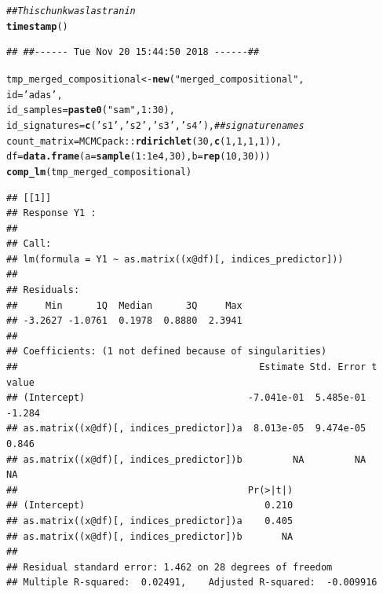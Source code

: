 \documentclass{article}\usepackage[]{graphicx}\usepackage[]{color}
\makeatletter
\newcommand{\hlnum}[1]{\textcolor[rgb]{0.686,0.059,0.569}{#1}}%
\newcommand{\hlstr}[1]{\textcolor[rgb]{0.192,0.494,0.8}{#1}}%
\newcommand{\hlcom}[1]{\textcolor[rgb]{0.678,0.584,0.686}{\textit{#1}}}%
\newcommand{\hlopt}[1]{\textcolor[rgb]{0,0,0}{#1}}%
\newcommand{\hlstd}[1]{\textcolor[rgb]{0.345,0.345,0.345}{#1}}%
\newcommand{\hlkwb}[1]{\textcolor[rgb]{0.69,0.353,0.396}{#1}}%
\newcommand{\hlkwc}[1]{\textcolor[rgb]{0.333,0.667,0.333}{#1}}%
\newcommand{\hlkwd}[1]{\textcolor[rgb]{0.737,0.353,0.396}{\textbf{#1}}}%
\newenvironment{kframe}{%
 \def\at@end@of@kframe{}%
 \ifinner\ifhmode%
  \def\at@end@of@kframe{\end{minipage}}%
  \begin{minipage}{\columnwidth}%
 \fi\fi%
 \def\FrameCommand##1{\hskip\@totalleftmargin \hskip-\fboxsep
 \colorbox{shadecolor}{##1}\hskip-\fboxsep
     \hskip-\linewidth \hskip-\@totalleftmargin \hskip\columnwidth}%
 \MakeFramed {\advance\hsize-\width
   \@totalleftmargin\z@ \linewidth\hsize
   \@setminipage}}%
 {\par\unskip\endMakeFramed%
 \at@end@of@kframe}
\newenvironment{knitrout}{}{} %
\makeatother
\begin{document}
\begin{knitrout}
\color{fgcolor}\begin{kframe}
\begin{alltt}
\hlcom{## This chunk was last ran in}
\hlkwd{timestamp}\hlstd{()}
\end{alltt}
\begin{verbatim}
## ##------ Tue Nov 20 15:44:50 2018 ------##
\end{verbatim}
\begin{alltt}
\hlstd{tmp_merged_compositional} \hlkwb{<-} \hlkwd{new}\hlstd{(}\hlstr{"merged_compositional"}\hlstd{,}
                                \hlkwc{id}\hlstd{=}\hlstr{'adas'}\hlstd{,}
                                \hlkwc{id_samples}\hlstd{=}\hlkwd{paste0}\hlstd{(}\hlstr{"sam"}\hlstd{,} \hlnum{1}\hlopt{:}\hlnum{30}\hlstd{),}
                                \hlkwc{id_signatures}\hlstd{=} \hlkwd{c}\hlstd{(}\hlstr{'s1'}\hlstd{,} \hlstr{'s2'}\hlstd{,} \hlstr{'s3'}\hlstd{,} \hlstr{'s4'}\hlstd{),} \hlcom{## signature names}
                                \hlkwc{count_matrix}\hlstd{=MCMCpack}\hlopt{::}\hlkwd{rdirichlet}\hlstd{(}\hlnum{30}\hlstd{,} \hlkwd{c}\hlstd{(}\hlnum{1}\hlstd{,}\hlnum{1}\hlstd{,}\hlnum{1}\hlstd{,}\hlnum{1}\hlstd{)),}
                                \hlkwc{df}\hlstd{=}\hlkwd{data.frame}\hlstd{(}\hlkwc{a}\hlstd{=}\hlkwd{sample}\hlstd{(}\hlnum{1}\hlopt{:}\hlnum{1e4}\hlstd{,} \hlnum{30}\hlstd{),} \hlkwc{b}\hlstd{=}\hlkwd{rep}\hlstd{(}\hlnum{10}\hlstd{,} \hlnum{30}\hlstd{)))}
\hlkwd{comp_lm}\hlstd{(tmp_merged_compositional)}
\end{alltt}
\begin{verbatim}
## [[1]]
## Response Y1 :
## 
## Call:
## lm(formula = Y1 ~ as.matrix((x@df)[, indices_predictor]))
## 
## Residuals:
##     Min      1Q  Median      3Q     Max 
## -3.2627 -1.0761  0.1978  0.8880  2.3941 
## 
## Coefficients: (1 not defined because of singularities)
##                                           Estimate Std. Error t value
## (Intercept)                             -7.041e-01  5.485e-01  -1.284
## as.matrix((x@df)[, indices_predictor])a  8.013e-05  9.474e-05   0.846
## as.matrix((x@df)[, indices_predictor])b         NA         NA      NA
##                                         Pr(>|t|)
## (Intercept)                                0.210
## as.matrix((x@df)[, indices_predictor])a    0.405
## as.matrix((x@df)[, indices_predictor])b       NA
## 
## Residual standard error: 1.462 on 28 degrees of freedom
## Multiple R-squared:  0.02491,	Adjusted R-squared:  -0.009916 

\end{verbatim}
\end{kframe}
\end{knitrout}
\end{document}

